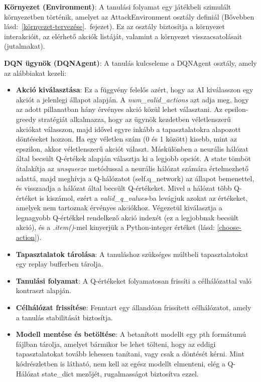\documentclass[
]{thesis-ekf}
\theoremstyle{definition}
\theoremstyle{remark}
\begin{document}
	\textbf{Környezet (Environment)}: A tanulási folyamat egy játékbeli szimulált környezetben történik, amelyet az AttackEnvironment osztály definiál (Bővebben lásd:~\ref{környezet-tervezése}.~fejezet). Ez az osztály biztosítja a környezet interakcióit, az elérhető akciók listáját, valamint a környezet visszacsatolásait (jutalmakat).
	
	\textbf{DQN ügynök (DQNAgent)}: A tanulás kulcseleme a DQNAgent osztály, amely az alábbiakat kezeli:
	
	\begin{itemize}
		\item \textbf{Akció kiválasztása}: Ez a függvény felelős azért, hogy az AI kiválasszon egy akciót a jelenlegi állapot alapján. A \emph{num\_valid\_actions} azt adja meg, hogy az adott pillanatban hány érvényes akció közül lehet választani. Az epsilon-greedy stratégiát alkalmazza, hogy az ügynök kezdetben véletlenszerű akciókat válasszon, majd idővel egyre inkább a tapasztalatokra alapozott döntéseket hozzon. Ha egy véletlen szám (0 és 1 között) kisebb, mint az epszilon, akkor véletlenszerű akciót választ. Máskülönben a neurális hálózat által becsült Q-értékek alapján választja ki a legjobb opciót. A state tömböt átalakítja az \emph{unsqueeze} metódussal a neurális hálózat számára értelmezhető adattá, majd meghívja a Q-hálózatot (self.q\_network) az állapot bemenettel, és visszaadja a hálózat által becsült Q-értékeket. Mivel a hálózat több Q-értéket is kiszámol, ezért a  \emph{valid\_q\_values}-ba levágjuk azokat az értékeket, amelyek nem tartoznak érvényes akciókhoz. Végezetül kiválasztja a legnagyobb Q-értékkel rendelkező akció indexét (ez a legjobbnak becsült akció), és a \emph{.item()}-mel kinyerjük a Python-integer értéket (lásd: \ref{choose-action}).
		
		\item \textbf{Tapasztalatok tárolása}: A tanuláshoz szükséges múltbeli tapasztalatokat egy replay bufferben tárolja.
		\item \textbf{Tanulási folyamat}: A Q-értékeket folyamatosan frissíti a célhálózattal való kontraszt alapján.
		\item \textbf{Célhálózat frissítése}: Fenntart egy állandóan frissített célhálózatot, amely a tanulás stabilitását biztosítja.
		\item \textbf{Modell mentése és betöltése}: A betanított modellt egy pth formátumú fájlban tárolja, amelyet bármikor be lehet tölteni, hogy az eddigi tapasztalatokat tovább lehessen tanítani, vagy csak a döntését kérni. Mint  kódrészletben is látható, nem kell az egész modellt elmenteni, elég a Q-Hálózat state\_dict mezőjét, rugalmasságot biztosítva ezzel. 
		
	\end{itemize}
	
\end{document}
